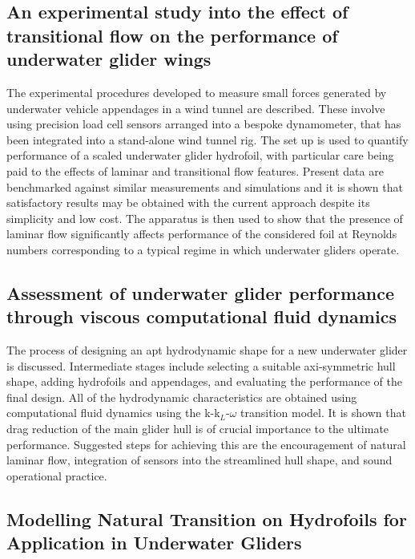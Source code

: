 \documentclass[a4paper,10pt]{article}
\begin{document}
\subsection{An experimental study into the effect of transitional flow on the performance of underwater glider wings \cite{Lidtke2017b}}

	The experimental procedures developed to measure small forces generated by underwater vehicle appendages in a wind tunnel are described. These involve using precision load cell sensors arranged into a bespoke dynamometer, that has been integrated into a stand-alone wind tunnel rig. The set up is used to quantify performance of a scaled underwater glider hydrofoil, with particular care being paid to the effects of laminar and transitional flow features. Present data are benchmarked against similar measurements and simulations and it is shown that satisfactory results may be obtained with the current approach despite its simplicity and low cost. The apparatus is then used to show that the presence of laminar flow significantly affects performance of the considered foil at Reynolds numbers corresponding to a typical regime in which underwater gliders operate.

\subsection{Assessment of underwater glider performance through viscous computational fluid dynamics \cite{Lidtke2016d}}

	The process of designing an apt hydrodynamic shape for a new underwater glider is discussed. Intermediate stages include selecting a suitable axi-symmetric hull shape, adding hydrofoils and appendages, and evaluating the performance of the final design. All of the hydrodynamic characteristics are obtained using computational fluid dynamics using the k-k$_L$-$\omega$ transition model. It is shown that drag reduction of the main glider hull is of crucial importance to the ultimate performance. Suggested steps for achieving this are the encouragement of natural laminar flow, integration of sensors into the streamlined hull shape, and sound operational practice.

\subsection{Modelling Natural Transition on Hydrofoils for Application in Underwater Gliders \cite{Lemaire2016}}
\end{document}
